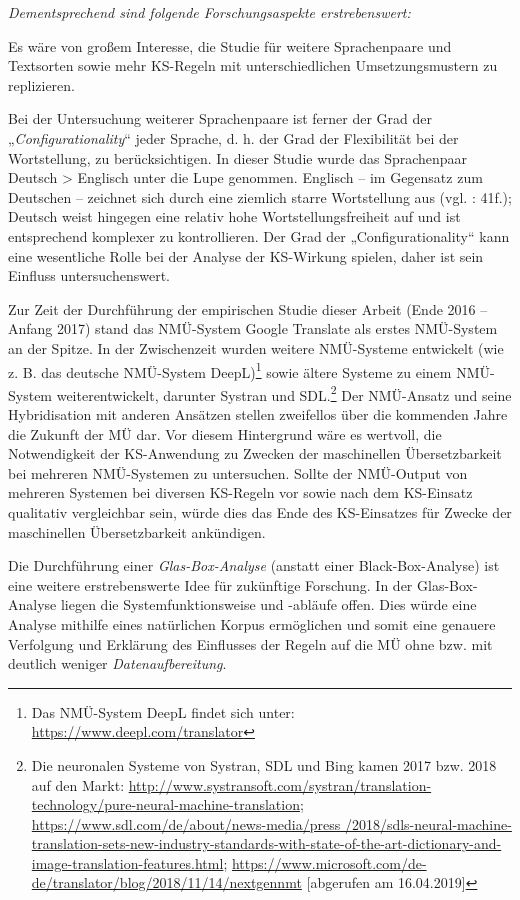 \largerpage
\textit{Dementsprechend sind folgende Forschungsaspekte erstrebenswert:}

Es wäre von großem Interesse, die Studie für weitere Sprachenpaare und Textsorten sowie mehr KS-Regeln mit unterschiedlichen Umsetzungsmustern zu replizieren.

Bei der Untersuchung weiterer Sprachenpaare ist ferner der Grad der „\textit{Configurationality}“ jeder Sprache, d. h. der Grad der Flexibilität bei der Wortstellung, zu berücksichtigen. In dieser Studie wurde das Sprachenpaar Deutsch > Englisch unter die Lupe genommen. Englisch -- im Gegensatz zum Deutschen -- zeichnet sich durch eine ziemlich starre Wortstellung aus (vgl. \citealt{Hawkins1986}: 41f.); Deutsch weist hingegen eine relativ hohe Wortstellungsfreiheit auf und ist entsprechend komplexer zu kontrollieren. Der Grad der „Configurationality“ kann eine wesentliche Rolle bei der Analyse der KS-Wirkung spielen, daher ist sein Einfluss untersuchenswert.

Zur Zeit der Durchführung der empirischen Studie dieser Arbeit (Ende 2016 – Anfang 2017) stand das NMÜ-System Google Translate als erstes NMÜ-System an der Spitze. In der Zwischenzeit wurden weitere NMÜ-Systeme entwickelt (wie z. B. das deutsche NMÜ-System DeepL)\footnote{\textrm{Das NMÜ-System DeepL findet sich unter:} \url{https://www.deepl.com/translator}} sowie ältere Systeme zu einem NMÜ-System weiterentwickelt, darunter Systran und SDL.\footnote{\textrm{Die neuronalen Systeme von Systran, SDL und Bing kamen 2017 bzw. 2018 auf den Markt:
\url{http://www.systransoft.com/systran/translation-technology/pure-neural-machine-translation};
\url{https://www.sdl.com/de/about/news-media/press /2018/sdls-neural-machine-translation-sets-new-industry-standards-with-state-of-the-art-dictionary-and-image-translation-features.html};
\url{https://www.microsoft.com/de-de/translator/blog/2018/11/14/nextgennmt} [abgerufen am 16.04.2019]}} Der NMÜ-Ansatz und seine Hybridisation mit anderen Ansätzen stellen zweifellos über die kommenden Jahre die Zukunft der MÜ dar. Vor diesem Hintergrund wäre es wertvoll, die Notwendigkeit der KS-Anwendung zu Zwecken der maschinellen Übersetzbarkeit bei mehreren NMÜ-Systemen zu untersuchen. Sollte der NMÜ-Output von mehreren Systemen bei diversen KS-Regeln vor sowie nach dem KS-Einsatz qualitativ vergleichbar sein, würde dies das Ende des KS-Einsatzes für Zwecke der maschinellen Übersetzbarkeit ankündigen.

Die Durchführung einer \textit{Glas-Box-Analyse} (anstatt einer Black-Box-Analyse) ist eine weitere erstrebenswerte Idee für zukünftige Forschung. In der Glas-Box-Analyse liegen die Systemfunktionsweise und -abläufe offen. Dies würde eine Analyse mithilfe eines natürlichen Korpus ermöglichen und somit eine genauere Verfolgung und Erklärung des Einflusses der Regeln auf die MÜ ohne bzw. mit deutlich weniger \textit{Datenaufbereitung}.

